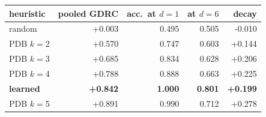 \begin{tabular}{lrrrr}
\toprule
heuristic & pooled GDRC & acc.\ at $d{=}1$ & at $d{=}6$ & decay \\
\midrule
random & +0.003 & 0.495 & 0.505 & -0.010 \\
PDB $k{=}$2 & +0.570 & 0.747 & 0.603 & +0.144 \\
PDB $k{=}$3 & +0.685 & 0.834 & 0.628 & +0.206 \\
PDB $k{=}$4 & +0.788 & 0.888 & 0.663 & +0.225 \\
\textbf{learned} & \textbf{+0.842} & \textbf{1.000} & \textbf{0.801} & \textbf{+0.199} \\
PDB $k{=}$5 & +0.891 & 0.990 & 0.712 & +0.278 \\
\bottomrule
\end{tabular}